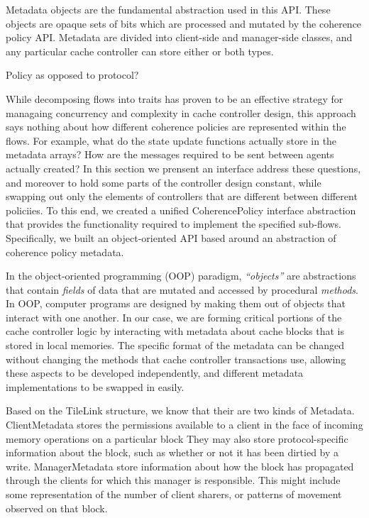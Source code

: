 Metadata objects are the fundamental abstraction used in this API.
These objects are opaque sets of bits which are processed and mutated by the coherence policy API.
Metadata are divided into client-side and manager-side classes,
and any particular cache controller can store either or both types.

Policy as opposed to protocol?

While decomposing flows into traits has proven to be an effective strategy for managaing concurrency and complexity in cache controller design,
this approach says nothing about how different coherence policies are represented within the flows.
For example, what do the state update functions actually store in the metadata arrays?
How are the messages required to be sent between agents actually created?
In this section we prensent an interface address these questions, and moreover to 
hold some parts of the controller design constant, while swapping out only the
elements of controllers that are different between different policiies.
To this end, we created a unified CoherencePolicy interface abstraction that provides the functionality required to implement the specified sub-flows.
Specifically, we built an object-oriented API based around an abstraction of coherence policy metadata.

In the object-oriented programming (OOP) paradigm, \emph{``objects''} are abstractions that contain \emph{fields} of data that are mutated and accessed by procedural \emph{methods}.
In OOP, computer programs are designed by making them out of objects that interact with one another.
In our case, we are forming critical portions of the cache controller logic by interacting with metadata about cache blocks that is stored in local memories.
The specific format of the metadata can be changed without changing the methods that cache controller transactions use,
allowing these aspects to be developed independently, and different metadata implementations to be swapped in easily.


Based on the TileLink structure, we know that their are two kinds of Metadata.
ClientMetadata stores the permissions available to a client in the face of incoming memory operations on a particular block
They may also store protocol-specific information about the block, such as whether or not it has been dirtied by a write.
ManagerMetadata store information about how the block has propagated through the clients for which this manager is responsible.
This might include some representation of the number of client sharers, or patterns of movement observed on that block.

